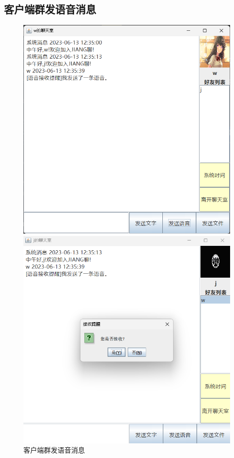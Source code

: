 \documentclass[UTF8,12pt]{article}
\begin{document}
\subsection{客户端群发语音消息}
\begin{figure}[htbp]
    \centering
    \begin{minipage}{0.4\textwidth}
        \centering
        \includegraphics[width=1.0\textwidth]{img/17.png}
    \end{minipage}
    \begin{minipage}{0.4\textwidth}
        \centering
        \includegraphics[width=1.0\textwidth]{img/18.png}
    \end{minipage}
    \caption{客户端群发语音消息}
\end{figure}
\end{document}
